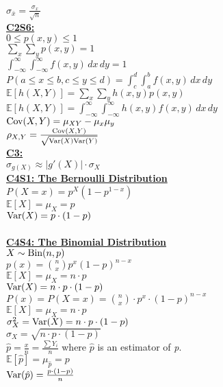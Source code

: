 \documentclass[letter, 12pt]{article}
\begin{document}
\begin{multicols}{2}
\(\sigma_{\bar{x}} = \frac{\sigma_x}{\sqrt{n}}\)\\
\textbf{\uline{C2S6:}}\\
\(0 \leq p(x,y) \leq 1\)\\
\(\sum_x \sum_y p(x,y) = 1\)\\
\(\int_{-\infty}^\infty \int_{-\infty}^\infty f(x,y)\,dx\,dy = 1\)\\
\(P(a \leq x \leq b, c \leq y \leq d) = \int_c^d \int_a^b f(x,y) \,dx\,dy\)\\
\(\mathds{E}[h(X,Y)] = \sum_x \sum_y h(x, y) p(x, y)\)\\
\(\mathds{E}[h(X,Y)] = \int_{-\infty}^\infty \int_{-\infty}^\infty h(x, y) f(x, y)\,dx\,dy\)\\
\(\textnormal{Cov}(X,Y) = \mu_{XY}-\mu_x\mu_y\)\\
\(\rho_{X,Y} = \frac{\textnormal{Cov}(X,Y)}{\sqrt{\textnormal{Var}(X)\textnormal{Var}(Y)}}\)\\
\textbf{\uline{C3:}}\\
\(\sigma_{g(X)} \approx \vert g'(X)\vert \cdot \sigma_X\)\\
\textbf{\uline{C4S1: The Bernoulli Distribution}}\\
\(P(X=x) = p^X(1-p^{1-x})\)\\
\(\mathds{E}[X] = \mu_X = p\)\\
\(\textnormal{Var}(X) = p\cdot(1-p)\)\\
\\
\textbf{\uline{C4S4: The Binomial Distribution}}\\
\(X \sim \textnormal{Bin}(n, p)\)\\
\(p(x) = {n \choose x} p^x(1-p)^{n-x}\)\\
\(\mathds{E}[X] = \mu_X = n\cdot p\)\\
\(\textnormal{Var}(X) = n\cdot p\cdot(1-p)\)\\
\(P(x) = P(X = x) = {n \choose x} \cdot p^x \cdot (1-p)^{n-x}\)\\
\(\mathds{E}[X] = \mu_X  = n\cdot p\)\\
\(\sigma^2_X = \textnormal{Var}(X) = n\cdot p \cdot (1-p)\)\\
\(\sigma_X = \sqrt{n\cdot p \cdot (1-p)}\)\\
\(\hat{p} = \frac{x}{n} = \frac{\sum Y_i}{n}\) where \(\hat{p}\) is an estimator of \textit{p}.\\
\(\mathds{E}[\hat{p}] = \mu_{\hat{p}}  = p\)\\
\(\textnormal{Var}(\hat{p}) = \frac{p\cdot (1-p)}{n}\)\\
\vfill
\columnbreak
\vspace*{\fill}
\end{multicols}
\end{document}
